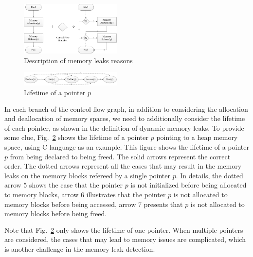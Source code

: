 \begin{figure}[!h]
\center
\includegraphics[width=0.45\textwidth]{figure/fig1-fig4/fig1}
\caption{Description of memory leaks reasons}
\label{fig:1}
\end{figure}

\begin{figure}[!h]
\center
\includegraphics[width=0.45\textwidth]{figure/fig1-fig4/fig2}
\caption{Lifetime of a pointer $p$}
\label{fig:2}
\end{figure}

In each branch of the control flow graph, in addition to considering the allocation and deallocation of memory spaces, we need to additionally consider the lifetime of each pointer, as shown in the definition of dynamic memory leaks. To provide some clue, Fig.~\ref{fig:2} shows the lifetime of a pointer $p$ pointing to a heap memory space, using C language as an example. This figure shows the lifetime of a pointer $p$ from being declared to being freed. The solid arrows represent the correct order. The dotted arrows represent all the cases that may result in the memory leaks on the memory blocks refereed by a single pointer $p$. In details, the dotted arrow $5$ shows the case that the pointer $p$ is not initialized before being allocated to memory blocks, arrow $6$ illustrates that the pointer $p$ is not allocated to memory blocks before being accessed, arrow $7$ presents that $p$ is not allocated to memory blocks before being freed.

Note that Fig.~\ref{fig:2} only shows the lifetime of one pointer. When multiple pointers are considered, the cases that may lead to memory issues are complicated, which is another challenge in the memory leak detection.